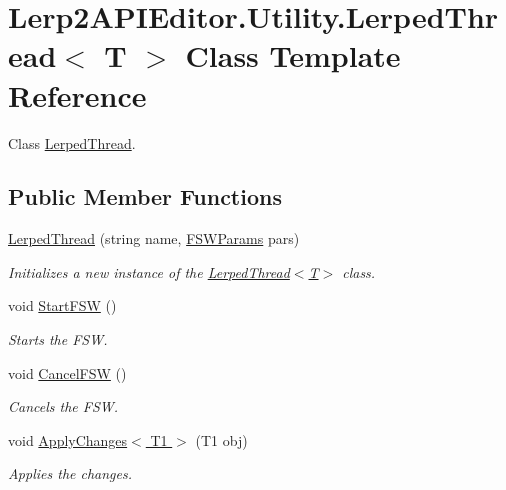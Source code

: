 \hypertarget{class_lerp2_a_p_i_editor_1_1_utility_1_1_lerped_thread}{}\section{Lerp2\+A\+P\+I\+Editor.\+Utility.\+Lerped\+Thread$<$ T $>$ Class Template Reference}
\label{class_lerp2_a_p_i_editor_1_1_utility_1_1_lerped_thread}


Class \hyperlink{class_lerp2_a_p_i_editor_1_1_utility_1_1_lerped_thread}{Lerped\+Thread}.  


\subsection*{Public Member Functions}
\begin{DoxyCompactItemize}
\item 
\hyperlink{class_lerp2_a_p_i_editor_1_1_utility_1_1_lerped_thread_aacf5f152ac26f2d26e36f4473e7cda98}{Lerped\+Thread} (string name, \hyperlink{class_lerp2_a_p_i_editor_1_1_utility_1_1_f_s_w_params}{F\+S\+W\+Params} pars)
\begin{DoxyCompactList}\small\item\em Initializes a new instance of the \hyperlink{class_lerp2_a_p_i_editor_1_1_utility_1_1_lerped_thread_aacf5f152ac26f2d26e36f4473e7cda98}{Lerped\+Thread$<$\+T$>$} class. \end{DoxyCompactList}\item 
void \hyperlink{class_lerp2_a_p_i_editor_1_1_utility_1_1_lerped_thread_a97f557394f9bfe74fc1be4d937ed7a71}{Start\+F\+SW} ()
\begin{DoxyCompactList}\small\item\em Starts the F\+SW. \end{DoxyCompactList}\item 
void \hyperlink{class_lerp2_a_p_i_editor_1_1_utility_1_1_lerped_thread_aabbc33217652af1e85bdfd31a47fb0b7}{Cancel\+F\+SW} ()
\begin{DoxyCompactList}\small\item\em Cancels the F\+SW. \end{DoxyCompactList}\item 
void \hyperlink{class_lerp2_a_p_i_editor_1_1_utility_1_1_lerped_thread_a629e3792903979b729ea20c55a2fbae1}{Apply\+Changes$<$ T1 $>$} (T1 obj)
\begin{DoxyCompactList}\small\item\em Applies the changes. \end{DoxyCompactList}\end{DoxyCompactItemize}
